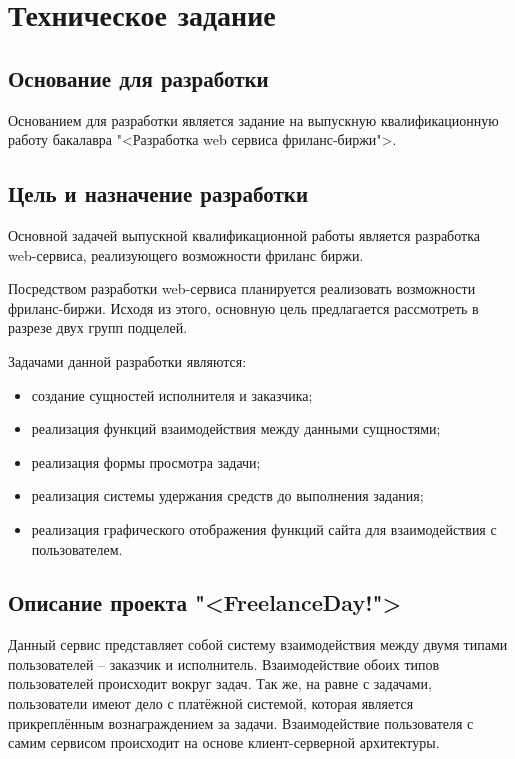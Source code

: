 \section{Техническое задание}
\subsection{Основание для разработки}

Основанием для разработки является задание на выпускную квалификационную работу бакалавра "<Разработка web сервиса фриланс-биржи">.

\subsection{Цель и назначение разработки}

Основной задачей выпускной квалификационной работы является разработка web-сервиса, реализующего возможности фриланс биржи.

Посредством разработки web-сервиса планируется реализовать возможности фриланс-биржи. Исходя из этого, основную цель предлагается рассмотреть в разрезе двух групп подцелей.

Задачами данной разработки являются:
\begin{itemize}
\item создание сущностей исполнителя и заказчика;
\item реализация функций взаимодействия между данными сущностями;
\item реализация формы просмотра задачи;
\item реализация системы удержания средств до выполнения задания;
\item реализация графического отображения функций сайта для взаимодействия с пользователем.
\end{itemize}

\subsection{Описание проекта "<FreelanceDay!">}

Данный сервис представляет собой систему взаимодействия между двумя типами пользователей -- заказчик и исполнитель. Взаимодействие обоих типов пользователей происходит вокруг задач. Так же, на равне с задачами, пользователи имеют дело с платёжной системой, которая является прикреплённым вознаграждением за задачи. Взаимодействие пользователя с самим сервисом происходит на основе клиент-серверной архитектуры.

